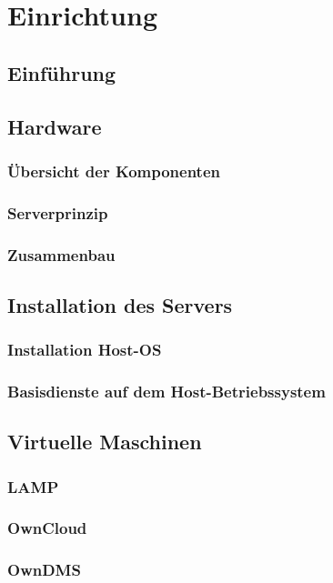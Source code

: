 \chapter{Einrichtung}

\section{Einführung}

\section{Hardware}
\subsection{Übersicht der Komponenten}

\subsection{Serverprinzip}

\subsection{Zusammenbau}

\section{Installation des Servers}
\subsection{Installation Host-OS}

\subsection{Basisdienste auf dem Host-Betriebssystem}

\section{Virtuelle Maschinen}
\subsection{LAMP}

\subsection{OwnCloud}

\subsection{OwnDMS}
